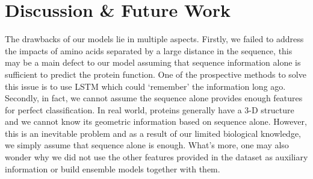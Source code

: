 \documentclass[sigconf]{acmart}
\begin{document}
\section{Discussion & Future Work}
The drawbacks of our models lie in multiple aspects. Firstly, we failed to address the impacts of amino acids separated by a large distance in the sequence, this may be a main defect to our model assuming that sequence information alone is sufficient to predict the protein function. One of the prospective methods to solve this issue is to use LSTM which could ‘remember’ the information long ago. Secondly, in fact, we cannot assume the sequence alone provides enough features for perfect classification. In real world, proteins generally have a 3-D structure and we cannot know its geometric information based on sequence alone. However, this is an inevitable problem and as a result of our limited biological knowledge, we simply assume that sequence alone is enough. What’s more, one may also wonder why we did not use the other features provided in the dataset as auxiliary information or build ensemble models together with them.

\newpage


\end{document}
